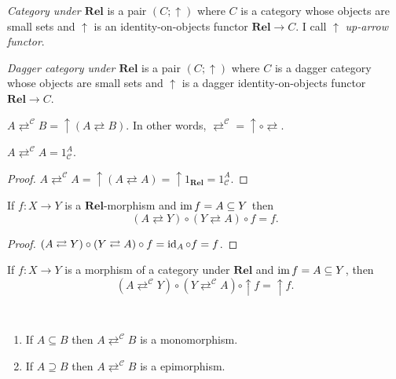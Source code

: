 \begin{defn}
\emph{Category under $\mathbf{Rel}$} is a pair $(C ; \uparrow)$
where $C$ is a category whose objects are small sets and $\uparrow$ is an
identity-on-objects functor $\mathbf{Rel} \rightarrow C$. I call
$\uparrow$ \emph{up-arrow functor}.
\end{defn}

\begin{defn}
  \emph{Dagger category under $\mathbf{Rel}$} is a pair $(C ;
  \uparrow)$ where $C$ is a dagger category whose objects are small sets and
  $\uparrow$ is a dagger identity-on-objects functor $\mathbf{Rel}
  \rightarrow C$.
\end{defn}

\begin{defn}
  $A \rightleftarrows^{\mathcal{C}} B = \uparrow (A \rightleftarrows B)$. In
  other words, $\rightleftarrows^{\mathcal{C}} = \uparrow \circ
  \rightleftarrows$.
\end{defn}

\begin{prop}
  $A \rightleftarrows^{\mathcal{C}} A = 1_{\mathcal{C}}^A$.
\end{prop}

\begin{proof}
  $A \rightleftarrows^{\mathcal{C}} A = \uparrow (A \rightleftarrows A) =
  \uparrow 1_{\mathbf{Rel}} = 1_{\mathcal{C}}^A$.
\end{proof}

\begin{prop}
  If $f : X \rightarrow Y$ is a $\mathbf{Rel}$-morphism and
  $\operatorname{im} f = A \subseteq Y$ then
  \[ (A \rightleftarrows Y) \circ (Y \rightleftarrows A) \circ f = f. \]
\end{prop}

\begin{proof}
  $(A \rightleftarrows Y) \circ (Y \rightleftarrows A) \circ f = \operatorname{id}_A
  \circ f = f$.
\end{proof}

\begin{cor}
  If $f : X \rightarrow Y$ is a morphism of a category under
  $\mathbf{Rel}$ and $\operatorname{im} f = A \subseteq Y$, then
  \[ (A \rightleftarrows^{\mathcal{C}} Y) \circ (Y
     \rightleftarrows^{\mathcal{C}} A) \circ \uparrow f = \uparrow f. \]
\end{cor}

\begin{prop}
  ~  
  \begin{enumerate}
    \item If $A \subseteq B$ then $A \rightleftarrows^{\mathcal{C}} B$ is a
    monomorphism.
    
    \item If $A \supseteq B$ then $A \rightleftarrows^{\mathcal{C}} B$ is a
    epimorphism.
  \end{enumerate}
\end{prop}


